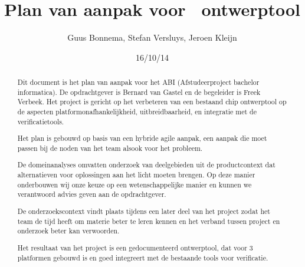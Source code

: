 \documentclass[a4paper,11pt]{article}
\author{Guus Bonnema, Stefan Versluys, Jeroen Kleijn}
\date{16/10/14}
\title{Plan van aanpak voor \xmas\ ontwerptool}
\begin{document}

\newcommand{\xmas}{x\textsc{mas}}%
\newcommand{\ok}{$\checkmark$}

\newcommand{\mybox}[1]{\begin{boxedminipage}[t]{\textwidth}#1\end{boxedminipage}}


\newcommand\secformat[1]{%
    {\fontsize{60}{60}\selectfont\thesection}%
    \ifthenelse{\equal{\thesection}{}}{}{\quad\rule[-8pt]{2pt}{40pt}\quad}
    \parbox[b]{.7\textwidth}{\filright\bfseries #1}}%
\titleformat{\section}[block]
    {\filright\normalfont\sffamily}{}{0pt}{\secformat}
[1pc]

\maketitle

\begin{abstract}
 Dit document is het plan van aanpak voor het ABI (Afstudeerproject bachelor
 informatica). De opdrachtgever is Bernard van Gastel en de begeleider is
 Freek Verbeek. Het project is gericht op het verbeteren van een bestaand
 chip ontwerptool op de aspecten platformonafhankelijkheid, uitbreidbaarheid,
 en integratie met de verificatietools.

 Het plan is gebouwd op basis van een hybride agile aanpak, een aanpak die
 moet passen bij de noden van het team alsook voor het probleem.

 De domeinanalyses omvatten onderzoek van deelgebieden uit de productcontext
 dat alternatieven voor oplossingen aan het licht moeten brengen.
 Op deze manier onderbouwen wij onze keuze op een wetenschappelijke manier
 en kunnen we verantwoord advies geven aan de opdrachtgever.

 De onderzoekscontext vindt plaats tijdens een later deel van het project
 zodat het team de tijd heeft om materie beter te leren kennen en het
 verband tussen project en onderzoek beter kan verwoorden.

 Het resultaat van het project is een gedocumenteerd ontwerptool, dat voor
 3 platformen gebouwd is en goed integreert met de bestaande tools voor verificatie.

\end{abstract}
\end{document}
